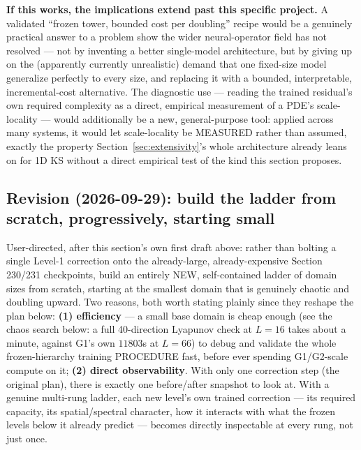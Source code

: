 \documentclass[11pt]{article}
\begin{document}
\textbf{If this works, the implications extend past this specific
project.} A validated ``frozen tower, bounded cost per doubling''
recipe would be a genuinely practical answer to a problem
\cite{zeroshotlargerdomains2026,falsepromisezeroshot2026} show the wider
neural-operator field has not resolved --- not by inventing a better
single-model architecture, but by giving up on the (apparently
currently unrealistic) demand that one fixed-size model generalize
perfectly to every size, and replacing it with a bounded, interpretable,
incremental-cost alternative. The diagnostic use --- reading the trained
residual's own required complexity as a direct, empirical measurement of
a PDE's scale-locality --- would additionally be a new, general-purpose
tool: applied across many systems, it would let scale-locality be
MEASURED rather than assumed, exactly the property Section~\ref{sec:extensivity}'s
whole architecture already leans on for 1D KS without a direct empirical
test of the kind this section proposes.

\subsection{Revision (2026-09-29): build the ladder from scratch, progressively, starting small}
\label{sec:residual_ladder_revision}

User-directed, after this section's own first draft above: rather than
bolting a single Level-1 correction onto the already-large, already-expensive
Section 230/231 checkpoints, build an entirely NEW, self-contained ladder
of domain sizes from scratch, starting at the smallest domain that is
genuinely chaotic and doubling upward. Two reasons, both worth stating
plainly since they reshape the plan below: \textbf{(1) efficiency} --- a
small base domain is cheap enough (see the chaos search below: a full
40-direction Lyapunov check at $L{=}16$ takes about a minute, against
G1's own $11803$s at $L{=}66$) to debug and validate the whole
frozen-hierarchy training PROCEDURE fast, before ever spending G1/G2-scale
compute on it; \textbf{(2) direct observability}. With only one
correction step (the original plan), there is exactly one before/after
snapshot to look at. With a genuine multi-rung ladder, each new level's
own trained correction --- its required capacity, its spatial/spectral
character, how it interacts with what the frozen levels below it already
predict --- becomes directly inspectable at every rung, not just once.
\end{document}
